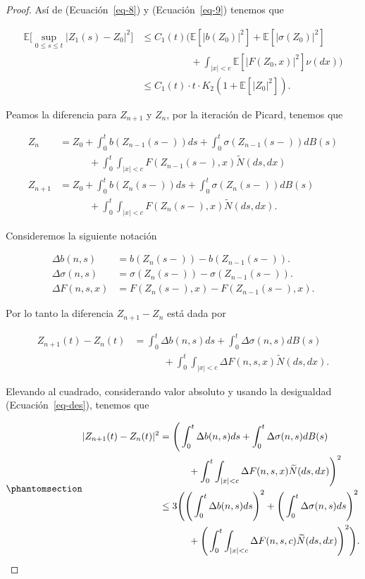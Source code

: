 \documentclass[
  spanish,
  us-letterpaper,
]{scrreprt}
\theoremstyle{plain}
\theoremstyle{plain}
\theoremstyle{plain}
\theoremstyle{definition}
\theoremstyle{remark}
\begin{document}
\begin{proof}
Así de (Ecuación~\ref{eq-8}) y (Ecuación~\ref{eq-9}) tenemos que

\[
    \begin{aligned}
        \mathbb{E}\Bigg[\sup\limits_{0\leq s\leq t}|Z_1(s)-Z_0|^2\Bigg]
        & \leq C_1(t)\Bigg(\mathbb{E}[|b(Z_0)|^2]+\mathbb{E}[|\sigma(Z_0)|^2]\\ 
        & \qquad \qquad\quad+\int_{|x|<c}\mathbb{E}[|F(Z_0,x)|^2]\nu(dx)\Bigg)\\
        & \leq C_1(t)\cdot t\cdot K_2(1+\mathbb{E}[|Z_0|^2]).
    \end{aligned}
\]

Peamos la diferencia para \(Z_{n+1}\) y \(Z_n\), por la iteración de
Picard, tenemos que

\[
    \begin{aligned}
        Z_n & = Z_0 + \int_0^t b(Z_{n-1}(s-))ds+\int_0^t \sigma(Z_{n-1}(s-))dB(s)\\ 
        &\qquad\quad + \int_0^t \int_{|x|<c} F(Z_{n-1}(s-),x)\widetilde{N}(ds,dx)\\ 
        Z_{n+1} & = Z_0 + \int_0^t b(Z_{n}(s-))ds+\int_0^t \sigma(Z_{n}(s-))dB(s)\\ 
        &\qquad\quad + \int_0^t \int_{|x|<c} F(Z_{n}(s-),x)\widetilde{N}(ds,dx).
    \end{aligned}
\]

Consideremos la siguiente notación

\[
    \begin{aligned}
        \Delta b(n,s) & = b(Z_n(s-))-b(Z_{n-1}(s-)).\\ 
        \Delta \sigma(n,s) & = \sigma(Z_n(s-))-\sigma(Z_{n-1}(s-)).\\ 
        \Delta F(n,s,x) & = F(Z_n(s-),x)-F(Z_{n-1}(s-),x).
    \end{aligned}
\]

Por lo tanto la diferencia \(Z_{n+1}-Z_n\) está dada por

\[
    \begin{aligned}
        Z_{n+1}(t)-Z_n(t) & = \int_0^t \Delta b(n,s)ds + \int_0^t \Delta \sigma(n,s)dB(s)\\ 
        & \qquad \quad +\int_0^t\int_{|x|<c}\Delta F(n,s,x)\widetilde{N}(ds,dx).
    \end{aligned}
\]

Elevando al cuadrado, considerando valor absoluto y usando la
desigualdad (Ecuación~\ref{eq-des}), tenemos que

\begin{equation}\phantomsection\label{eq-10}{
    \begin{aligned}
        |Z_{n+1}(t)-Z_n(t)|^2 & = \Bigg( \int_0^t \Delta b(n,s)ds + \int_0^t \Delta \sigma(n,s)dB(s)\\ 
        &\qquad\quad +\int_0^t\int_{|x|<c}\Delta F(n,s,x)\widetilde{N}(ds,dx)\Bigg)^2\\ 
        & \leq 3\Bigg(\Bigg(\int_0^t \Delta b(n,s)ds\Bigg)^2+\Bigg(\int_0^t  \Delta \sigma(n,s)ds\Bigg)^2\\ 
        &\qquad\quad +\Bigg(\int_0^t\int_{|x|<c}\Delta F(n,s,c)\widetilde{N}(ds,dx)\Bigg)^2\Bigg).
    \end{aligned}
}\end{equation}


\end{proof}
\end{document}
